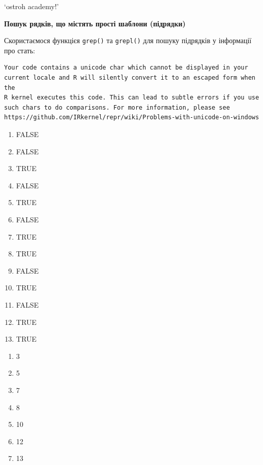 \documentclass[
  letterpaper,
  DIV=11,
  numbers=noendperiod]{scrreprt}
\newenvironment{Shaded}{\begin{snugshade}}{\end{snugshade}}
\newcommand{\CommentTok}[1]{\textcolor[rgb]{0.37,0.37,0.37}{#1}}
\newcommand{\FunctionTok}[1]{\textcolor[rgb]{0.28,0.35,0.67}{#1}}
\newcommand{\NormalTok}[1]{\textcolor[rgb]{0.00,0.23,0.31}{#1}}
\newcommand{\SpecialCharTok}[1]{\textcolor[rgb]{0.37,0.37,0.37}{#1}}
\newcommand{\StringTok}[1]{\textcolor[rgb]{0.13,0.47,0.30}{#1}}
\providecommand{\tightlist}{%
  \setlength{\itemsep}{0pt}\setlength{\parskip}{0pt}}\usepackage{longtable,booktabs,array}
\begin{document}
`ostroh academy!'

\textbf{Пошук рядків, що містять прості шаблони (підрядки)}

Скористаємося функцієя \texttt{grep()} та \texttt{grepl()} для пошуку
підрядків у інформації про стать:

\begin{Shaded}
\end{Shaded}

\begin{verbatim}
Your code contains a unicode char which cannot be displayed in your
current locale and R will silently convert it to an escaped form when the
R kernel executes this code. This can lead to subtle errors if you use
such chars to do comparisons. For more information, please see
https://github.com/IRkernel/repr/wiki/Problems-with-unicode-on-windows
\end{verbatim}

\begin{enumerate}
\def\labelenumi{\arabic{enumi}.}
\tightlist
\item
  FALSE
\item
  FALSE
\item
  TRUE
\item
  FALSE
\item
  TRUE
\item
  FALSE
\item
  TRUE
\item
  TRUE
\item
  FALSE
\item
  TRUE
\item
  FALSE
\item
  TRUE
\item
  TRUE
\end{enumerate}

\begin{enumerate}
\def\labelenumi{\arabic{enumi}.}
\tightlist
\item
  3
\item
  5
\item
  7
\item
  8
\item
  10
\item
  12
\item
  13
\end{enumerate}
\end{document}
